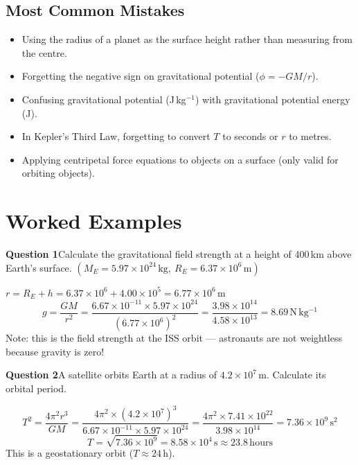 \subsection{Most Common Mistakes}
\begin{itemize}
  \item Using the radius of a planet as the surface height rather than measuring
        from the centre.
  \item Forgetting the negative sign on gravitational potential
        ($\phi = -GM/r$).
  \item Confusing gravitational potential (J\,kg$^{-1}$) with gravitational
        potential energy (J).
  \item In Kepler's Third Law, forgetting to convert $T$ to seconds or $r$ to
        metres.
  \item Applying centripetal force equations to objects on a surface (only valid
        for orbiting objects).
\end{itemize}

\section{Worked Examples}

\noindent\textbf{Question 1}\quad Calculate the gravitational field strength at a
height of 400\,km above Earth's surface.
$(M_E = 5.97\times10^{24}\,\mathrm{kg},\ R_E = 6.37\times10^6\,\mathrm{m})$

\begin{solutionbox}
$r = R_E + h = 6.37\times10^6 + 4.00\times10^5 = 6.77\times10^6\,\mathrm{m}$
\[
  g = \frac{GM}{r^2}
    = \frac{6.67\times10^{-11} \times 5.97\times10^{24}}{(6.77\times10^6)^2}
    = \frac{3.98\times10^{14}}{4.58\times10^{13}}
    = 8.69\,\mathrm{N\,kg^{-1}}
\]
Note: this is the field strength at the ISS orbit — astronauts are not weightless
because gravity is zero!
\end{solutionbox}

\bigskip
\noindent\textbf{Question 2}\quad A satellite orbits Earth at a radius of
$4.2\times10^7\,\mathrm{m}$. Calculate its orbital period.

\begin{solutionbox}
\[
  T^2 = \frac{4\pi^2 r^3}{GM}
      = \frac{4\pi^2 \times (4.2\times10^7)^3}{6.67\times10^{-11}
        \times 5.97\times10^{24}}
      = \frac{4\pi^2 \times 7.41\times10^{22}}{3.98\times10^{14}}
      = 7.36\times10^9\,\mathrm{s^2}
\]
\[
  T = \sqrt{7.36\times10^9} = 8.58\times10^4\,\mathrm{s} \approx 23.8\,\text{hours}
\]
This is a geostationary orbit ($T \approx 24\,\text{h}$).
\end{solutionbox}

